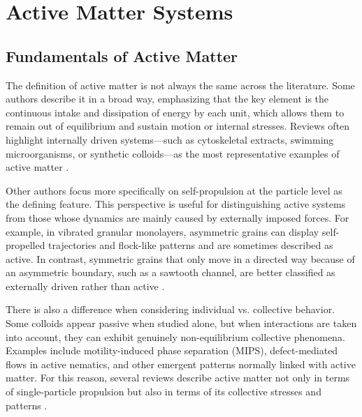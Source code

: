 \chapter{Active Matter Systems}
\label{ch:activeandpassivemattersystems}

\section{Fundamentals of Active Matter}


The definition of active matter is not always the same across the literature. Some authors describe it in a broad way, emphasizing that the key element is the continuous intake and dissipation of energy by each unit, which allows them to remain out of equilibrium and sustain motion or internal stresses. Reviews often highlight internally driven systems—such as cytoskeletal extracts, swimming microorganisms, or synthetic colloids—as the most representative examples of active matter \cite{ramaswamy2010mechanics, marchetti2013hydrodynamics, bechinger2016active}.

Other authors focus more specifically on self-propulsion at the particle level as the defining feature. This perspective is useful for distinguishing active systems from those whose dynamics are mainly caused by externally imposed forces. For example, in vibrated granular monolayers, asymmetric grains can display self-propelled trajectories and flock-like patterns and are sometimes described as active. In contrast, symmetric grains that only move in a directed way because of an asymmetric boundary, such as a sawtooth channel, are better classified as externally driven rather than active \cite{deseigne2010collective, mobarakabadi2013granular, fernandez2022active}.

There is also a difference when considering individual vs. collective behavior. Some colloids appear passive when studied alone, but when interactions are taken into account, they can exhibit genuinely non-equilibrium collective phenomena. Examples include motility-induced phase separation (MIPS), defect-mediated flows in active nematics, and other emergent patterns normally linked with active matter. For this reason, several reviews describe active matter not only in terms of single-particle propulsion but also in terms of its collective stresses and patterns \cite{cates2015motility, doostmohammadi2018active}.

